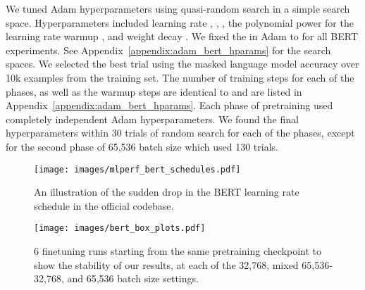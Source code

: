 \documentclass{article}
\begin{document}
We tuned Adam hyperparameters using quasi-random search \citep{bousquet2017critical} in a simple search space. Hyperparameters included learning rate , , , the polynomial power for the learning rate warmup , and weight decay . We fixed the  in Adam to  for all BERT experiments. See Appendix~\ref{appendix:adam_bert_hparams} for the search spaces. We selected the best trial using the masked language model accuracy over 10k examples from the training set. The number of training steps for each of the phases, as well as the warmup steps are identical to \citet{you2019lamb} and are listed in Appendix~\ref{appendix:adam_bert_hparams}.
Each phase of pretraining used completely independent Adam hyperparameters. We found the final hyperparameters within 30 trials of random search for each of the phases, except for the second phase of 65,536 batch size which used 130 trials. 

\begin{figure}[t]
    \centering
    \texttt{[image: images/mlperf\_bert\_schedules.pdf]}
    \caption{An illustration of the sudden drop in the BERT learning rate schedule in the official codebase.}
    \label{fig:mlperf_bert_schedules}
\end{figure}

\begin{figure}[t]
    \centering
    \texttt{[image: images/bert\_box\_plots.pdf]}
    \caption{6 finetuning runs starting from the same pretraining checkpoint to show the stability of our results, at each of the 32,768, mixed 65,536-32,768, and 65,536 batch size settings.}
\end{figure}
\end{document}
